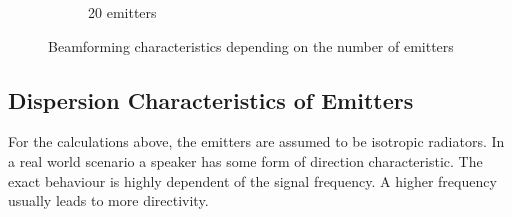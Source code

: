\begin{figure}[ht]
\begin{subfigure}[b]{0.32\textwidth}
    \caption{20 emitters}
    \label{fig:theory:beam:num_20}
  \end{subfigure}
  \caption{Beamforming characteristics depending on the number of emitters}
  \label{fig:theory:beam:num}
\end{figure}
%
\subsection{Dispersion Characteristics of Emitters}
For the calculations above, the emitters are assumed to be isotropic radiators. In a real world scenario a speaker has some form of direction characteristic. The exact behaviour is highly dependent of the signal frequency. A higher frequency usually leads to more directivity.\cite{cox_frequency-dependent_2007}\cite{hill_frequency_2014}\p
%
%
%
